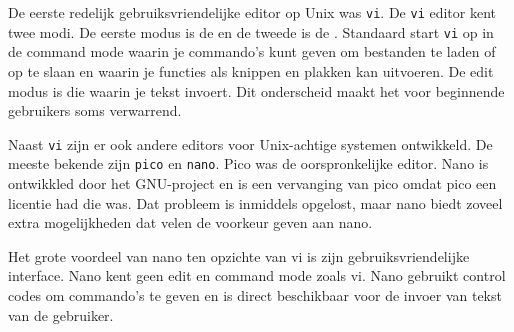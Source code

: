 De eerste redelijk gebruiksvriendelijke editor op Unix was \texttt{vi}. De \texttt{vi} editor kent twee modi. De eerste modus is de  en de tweede is de . Standaard start \texttt{vi} op in de command mode waarin je commando's kunt geven om bestanden te laden of op te slaan en waarin je functies als knippen en plakken kan uitvoeren. De edit modus is die waarin je tekst invoert. Dit onderscheid maakt het voor beginnende gebruikers soms verwarrend.

Naast \texttt{vi} zijn er ook andere editors voor Unix-achtige systemen ontwikkeld. De meeste bekende zijn \texttt{pico} en \texttt{nano}. Pico was de oorspronkelijke editor. Nano is ontwikkled door het GNU-project en is een vervanging van pico omdat pico een licentie had die  was. Dat probleem is inmiddels opgelost, maar nano biedt zoveel extra mogelijkheden dat velen de voorkeur geven aan nano.

Het grote voordeel van nano ten opzichte van vi is zijn gebruiksvriendelijke interface. Nano kent geen edit en command mode zoals vi. Nano gebruikt control codes om commando's te geven en is direct beschikbaar voor de invoer van tekst van de gebruiker.
